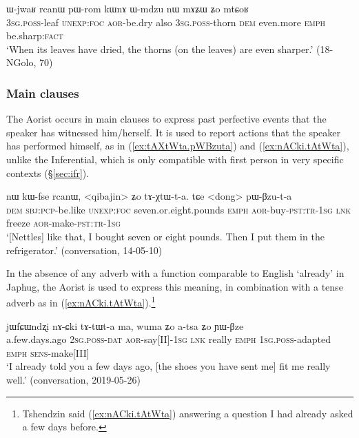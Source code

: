 \begin{exe}
\ex \label{ex:pWrom.kWnA}
 \gll  ɯ-jwaʁ rcanɯ pɯ-rom kɯnɤ ɯ-mdzu nɯ mɤʑɯ ʑo mtɕoʁ \\
\textsc{3sg}.\textsc{poss}-leaf \textsc{unexp}:\textsc{foc} \textsc{aor}-be.dry also \textsc{3sg}.\textsc{poss}-thorn \textsc{dem} even.more \textsc{emph} be.sharp:\textsc{fact} \\
\glt `When its leaves have dried, the thorns (on the leaves) are even sharper.' (18-NGolo, 70)
\end{exe}

\subsubsection{Main clauses}   \label{sec:aor.main}
The Aorist occurs in main clauses to express past perfective events that the speaker has witnessed him/herself. It is used to report actions that the speaker has performed himself, as in (\ref{ex:tAXtWta.pWBzuta}) and (\ref{ex:nACki.tAtWta}), unlike the Inferential, which is only compatible with first person in very specific contexts (§\ref{sec:ifr}).

\begin{exe}
\ex \label{ex:tAXtWta.pWBzuta}
 \gll nɯ kɯ-fse rcanɯ, <qibajin> ʑo tɤ-χtɯ-t-a. tɕe <dong> pɯ-βzu-t-a  \\
\textsc{dem} \textsc{sbj}:\textsc{pcp}-be.like \textsc{unexp}:\textsc{foc} seven.or.eight.pounds \textsc{emph} \textsc{aor}-buy-\textsc{pst}:\textsc{tr}-\textsc{1sg} \textsc{lnk} freeze \textsc{aor}-make-\textsc{pst}:\textsc{tr}-\textsc{1sg} \\
\glt `[Nettles] like that, I bought seven or eight pounds. Then I put them in the refrigerator.' (conversation, 14-05-10)
\end{exe}

In the absence of any adverb with a function comparable to English `already' in Japhug, the Aorist is used to express this meaning, in combination with a tense adverb as in (\ref{ex:nACki.tAtWta}).\footnote{Tshendzin said (\ref{ex:nACki.tAtWta}) answering a question I had already asked a few days before. }

\begin{exe}
\ex \label{ex:nACki.tAtWta}
 \gll jɯfɕɯndʐi nɤ-ɕki tɤ-tɯt-a ma, wuma ʑo a-tsa ʑo ɲɯ-βze  \\
 a.few.days.ago \textsc{2sg}.\textsc{poss}-\textsc{dat} \textsc{aor}-say[II]-\textsc{1sg} \textsc{lnk} really \textsc{emph} \textsc{1sg}.\textsc{poss}-adapted \textsc{emph} \textsc{sens}-make[III] \\
 \glt `I already told you a few days ago, [the shoes you have sent me] fit me really well.' (conversation, 2019-05-26)
\end{exe}

